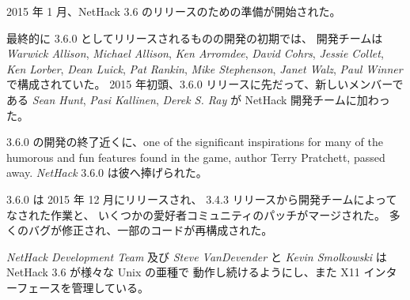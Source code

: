 \medskip
2015 年 1 月、NetHack 3.6 のリリースのための準備が開始された。

\medskip
最終的に 3.6.0 としてリリースされるものの開発の初期では、
開発チームは {\it Warwick Allison},
{\it Michael Allison}, {\it Ken Arromdee},
{\it David Cohrs}, {\it Jessie Collet},
{\it Ken Lorber}, {\it Dean Luick}, {\it Pat Rankin},
{\it Mike Stephenson}, {\it Janet Walz}, {\it Paul Winner} で構成されていた。
2015 年初頭、3.6.0 リリースに先だって、新しいメンバーである
{\it Sean Hunt}, {\it Pasi Kallinen}, {\it Derek S. Ray} が
NetHack 開発チームに加わった。

\medskip
3.6.0 の開発の終了近くに、one of the significant inspirations
for many of the humorous and fun features found in the game,
author Terry Pratchett, passed away.
{\it NetHack\/} 3.6.0 は彼へ捧げられた。

\medskip
3.6.0 は 2015 年 12 月にリリースされ、
3.4.3 リリースから開発チームによってなされた作業と、
いくつかの愛好者コミュニティのパッチがマージされた。
多くのバグが修正され、一部のコードが再構成された。

\medskip
{\it NetHack Development Team} 及び {\it Steve VanDevender} と
{\it Kevin Smolkowski} は NetHack 3.6 が様々な Unix の亜種で
動作し続けるようにし、また X11 インターフェースを管理している。

